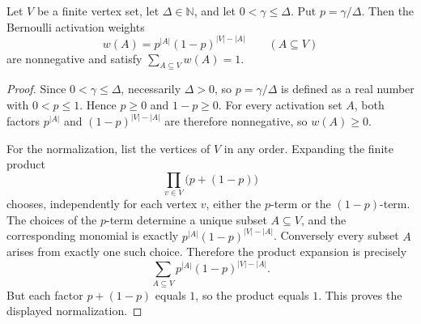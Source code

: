 \begin{lemma}
Let \(V\) be a finite vertex set, let \(\Delta\in\mathbb N\), and let
\(0<\gamma\le \Delta\).  Put \(p=\gamma/\Delta\).  Then the Bernoulli
activation weights
\[
w(A)=p^{|A|}(1-p)^{|V|-|A|}\qquad(A\subseteq V)
\]
are nonnegative and satisfy \(\sum_{A\subseteq V} w(A)=1\).
\end{lemma}
\begin{proof}
Since \(0<\gamma\le\Delta\), necessarily \(\Delta>0\), so \(p=\gamma/\Delta\)
is defined as a real number with \(0<p\le 1\).  Hence \(p\ge 0\) and
\(1-p\ge 0\).  For every activation set \(A\), both factors
\(p^{|A|}\) and \((1-p)^{|V|-|A|}\) are therefore nonnegative, so
\(w(A)\ge0\).

For the normalization, list the vertices of \(V\) in any order.  Expanding the
finite product
\[
\prod_{v\in V}\bigl(p+(1-p)\bigr)
\]
chooses, independently for each vertex \(v\), either the \(p\)-term or the
\((1-p)\)-term.  The choices of the \(p\)-term determine a unique subset
\(A\subseteq V\), and the corresponding monomial is exactly
\(p^{|A|}(1-p)^{|V|-|A|}\).  Conversely every subset \(A\) arises from exactly
one such choice.  Therefore the product expansion is precisely
\[
\sum_{A\subseteq V} p^{|A|}(1-p)^{|V|-|A|}.
\]
But each factor \(p+(1-p)\) equals \(1\), so the product equals \(1\).  This
proves the displayed normalization.
\end{proof}
